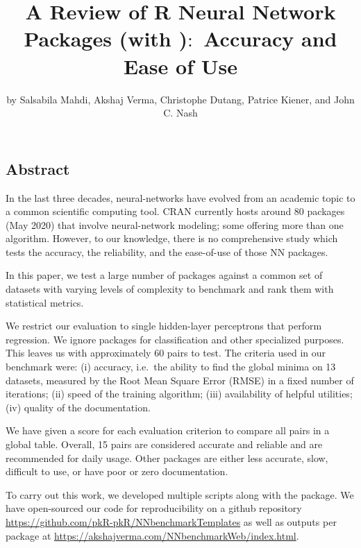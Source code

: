 \title{A Review of R Neural Network Packages (with
)\(:\) Accuracy and Ease of Use}
\author{by Salsabila Mahdi, Akshaj Verma, Christophe Dutang, Patrice
Kiener, and John C. Nash}

\maketitle


\hypertarget{abstract}{%
\subsection{Abstract}\label{abstract}}

In the last three decades, neural-networks have evolved from an academic
topic to a common scientific computing tool. CRAN currently hosts around
80 packages (May 2020) that involve neural-network modeling; some
offering more than one algorithm. However, to our knowledge, there is no
comprehensive study which tests the accuracy, the reliability, and the
ease-of-use of those NN packages.

In this paper, we test a large number of packages against a common set
of datasets with varying levels of complexity to benchmark and rank them
with statistical metrics.

We restrict our evaluation to single hidden-layer perceptrons that
perform regression. We ignore packages for classification and other
specialized purposes. This leaves us with approximately 60
 pairs to test. The criteria used in our
benchmark were: (i) accuracy, i.e.~the ability to find the global minima
on 13 datasets, measured by the Root Mean Square Error (RMSE) in a fixed
number of iterations; (ii) speed of the training algorithm; (iii)
availability of helpful utilities; (iv) quality of the documentation.

We have given a score for each evaluation criterion to compare all
 pairs in a global table. Overall, 15 pairs are
considered accurate and reliable and are recommended for daily usage.
Other packages are either less accurate, slow, difficult to use, or have
poor or zero documentation.

To carry out this work, we developed multiple scripts along with the
 package. We have open-sourced our code for
reproducibility on a github repository
\url{https://github.com/pkR-pkR/NNbenchmarkTemplates} as well as outputs
per package at \url{https://akshajverma.com/NNbenchmarkWeb/index.html}.

